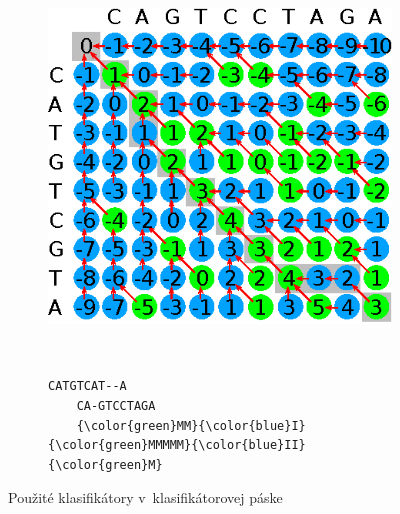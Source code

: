 \documentclass[xcolor=dvipsnames, compress, 12pt]{beamer}
\theoremstyle{definition}
\begin{document}
\begin{frame}[fragile]
\begin{figure}[htp]
    \centering
    \begin{subfigure}[m]{0.5\textwidth}
    \centering
    \includegraphics[width=\textwidth]{images/clf_tape}
    \end{subfigure}
    ~
    \begin{subfigure}[m]{0.3\textwidth}
    \centering
    \begin{BVerbatim}[commandchars=\\\{\}]
    CATGTCAT--A
    CA-GTCCTAGA
    {\color{green}MM}{\color{blue}I}{\color{green}MMMMM}{\color{blue}II}{\color{green}M}
    \end{BVerbatim}
    \end{subfigure}
    \caption{Použité klasifikátory v~klasifikátorovej páske}
    \label{fig:clf-tape}
\end{figure}
\end{frame}

\end{document}

